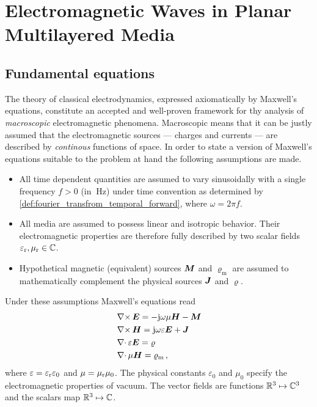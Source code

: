 \section{Electromagnetic Waves in Planar Multilayered Media}

\subsection{Fundamental equations}
\label{subsec:em_fundamental_equations}

The theory of classical electrodynamics, expressed axiomatically by Maxwell's
equations, constitute an accepted and well-proven framework for thy analysis of
\emph{macroscopic} electromagnetic phenomena.
Macroscopic means that it can be justly assumed that the electromagnetic
sources --- charges and currents --- are described by \emph{continous}
functions of space. 
In order to state a version of Maxwell's equations suitable to the problem at
hand the following assumptions are made.
\begin{itemize}
	\item All time dependent quantities are assumed to vary sinusoidally with
	a single frequency $f > 0$ (in $\SI{}{\hertz}$) under time convention
	as determined by \cref{def:fourier_transfrom_temporal_forward},
	where $\omega = 2\pi f$.
	\item All media are assumed to possess linear and isotropic behavior.
	Their electromagnetic properties are therefore fully described by two scalar
	fields $\varepsilon_{\mathrm{r}}, \mu_{\mathrm{r}} \in \mathbb{C}$.
	\item Hypothetical magnetic (equivalent) sources $\pvec{M}$ and
	$\varrho_\mathrm{m}$ are assumed to mathematically complement the physical
	sources $\pvec{J}$ and $\varrho$.
\end{itemize}
Under these assumptions Maxwell's equations read \cite{Chew1999}
\begin{subequations}\label{eq:mwe_fd}
	\begin{align}
		&\curl \pvec{E}
		= -\im\omega\mu\pvec{H} -\pvec{M} \label{eq:mwe_fd_faraday} \\
		&\curl \pvec{H}
		= \im\omega\varepsilon\pvec{E} + \pvec{J} \label{eq:mwe_fd_ampere} \\
		&\divergence \varepsilon\pvec{E}
		= \varrho \label{eq:mwe_fd_gauss} \\
		&\divergence \mu\pvec{H}
		= \varrho_\mathrm{m} \,, \label{eq:mwe_fd_gauss_magnetic}
	\end{align}
\end{subequations}
where $\varepsilon = \varepsilon_{\mathrm{r}} \varepsilon_0$ and $\mu = \mu_{\mathrm{r}} \mu_0$.
The physical constants $\varepsilon_0$ and $\mu_0$ specify the
electromagnetic properties of vacuum.
The vector fields are functions $\mathbb{R}^3 \mapsto \mathbb{C}^3$ and the scalars map
$\mathbb{R}^3 \mapsto \mathbb{C}$.

